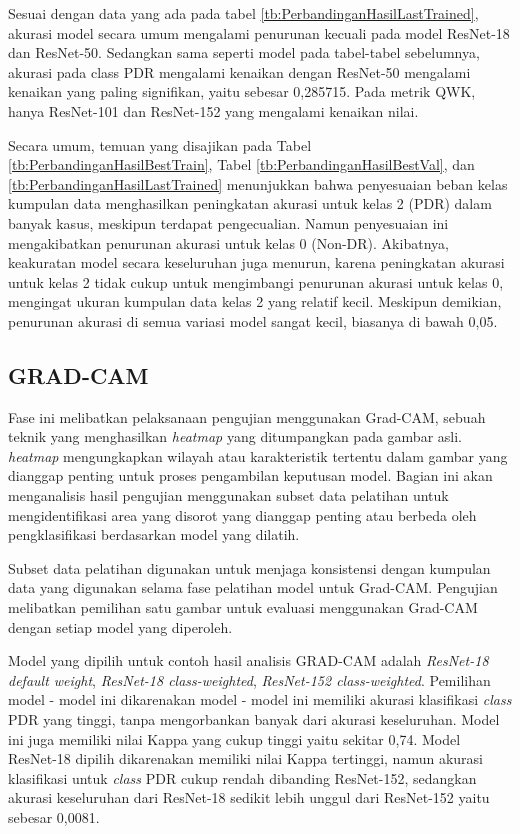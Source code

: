 Sesuai dengan data yang ada pada tabel \ref{tb:PerbandinganHasilLastTrained}, akurasi model secara umum mengalami penurunan kecuali pada model ResNet-18 dan ResNet-50. Sedangkan sama seperti model pada tabel-tabel sebelumnya, akurasi pada class PDR mengalami kenaikan dengan ResNet-50 mengalami kenaikan yang paling signifikan, yaitu sebesar 0,285715. Pada metrik QWK, hanya ResNet-101 dan ResNet-152 yang mengalami kenaikan nilai.

Secara umum, temuan yang disajikan pada Tabel \ref{tb:PerbandinganHasilBestTrain}, Tabel \ref{tb:PerbandinganHasilBestVal}, dan \ref{tb:PerbandinganHasilLastTrained} menunjukkan bahwa penyesuaian beban kelas kumpulan data menghasilkan peningkatan akurasi untuk kelas 2 (PDR) dalam banyak kasus, meskipun terdapat pengecualian. Namun penyesuaian ini mengakibatkan penurunan akurasi untuk kelas 0 (Non-DR). Akibatnya, keakuratan model secara keseluruhan juga menurun, karena peningkatan akurasi untuk kelas 2 tidak cukup untuk mengimbangi penurunan akurasi untuk kelas 0, mengingat ukuran kumpulan data kelas 2 yang relatif kecil. Meskipun demikian, penurunan akurasi di semua variasi model sangat kecil, biasanya di bawah 0,05.

\subsection{GRAD-CAM}
\label{sec:43}
Fase ini melibatkan pelaksanaan pengujian menggunakan Grad-CAM, sebuah teknik yang menghasilkan \emph{heatmap} yang ditumpangkan pada gambar asli. \emph{heatmap} mengungkapkan wilayah atau karakteristik tertentu dalam gambar yang dianggap penting untuk proses pengambilan keputusan model. Bagian ini akan menganalisis hasil pengujian menggunakan subset data pelatihan untuk mengidentifikasi area yang disorot yang dianggap penting atau berbeda oleh pengklasifikasi berdasarkan model yang dilatih. 

Subset data pelatihan digunakan untuk menjaga konsistensi dengan kumpulan data yang digunakan selama fase pelatihan model untuk Grad-CAM. Pengujian melibatkan pemilihan satu gambar untuk evaluasi menggunakan Grad-CAM dengan setiap model yang diperoleh.

Model yang dipilih untuk contoh hasil analisis GRAD-CAM adalah \emph{ResNet-18 default weight}, \emph{ResNet-18 class-weighted}, \emph{ResNet-152 class-weighted}. Pemilihan model - model ini dikarenakan model - model ini memiliki akurasi klasifikasi \emph{class} PDR yang tinggi, tanpa mengorbankan banyak dari akurasi keseluruhan. Model ini juga memiliki nilai Kappa yang cukup tinggi yaitu sekitar 0,74. Model ResNet-18 dipilih dikarenakan memiliki nilai Kappa tertinggi, namun akurasi klasifikasi untuk \emph{class} PDR cukup rendah dibanding ResNet-152, sedangkan akurasi keseluruhan dari ResNet-18 sedikit lebih unggul dari ResNet-152 yaitu sebesar 0,0081.

